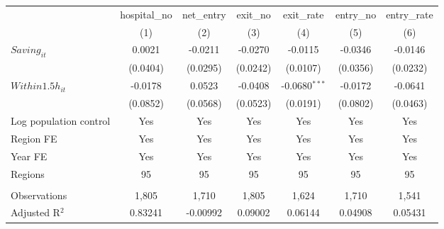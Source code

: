 \begingroup
\centering
\begin{tabular}{lcccccc}
   \toprule
                          & hospital\_no  & net\_entry  & exit\_no  & exit\_rate      & entry\_no  & entry\_rate \\    
                          & (1)           & (2)         & (3)       & (4)             & (5)        & (6)\\  
   \midrule 
   $Saving_{it}$          & 0.0021        & -0.0211     & -0.0270   & -0.0115         & -0.0346    & -0.0146\\   
                          & (0.0404)      & (0.0295)    & (0.0242)  & (0.0107)        & (0.0356)   & (0.0232)\\   
   $Within1.5h_{it}$      & -0.0178       & 0.0523      & -0.0408   & -0.0680$^{***}$ & -0.0172    & -0.0641\\   
                          & (0.0852)      & (0.0568)    & (0.0523)  & (0.0191)        & (0.0802)   & (0.0463)\\   
   Log population control & Yes           & Yes         & Yes       & Yes             & Yes        & Yes\\  
   Region FE              & Yes           & Yes         & Yes       & Yes             & Yes        & Yes\\  
   Year FE                & Yes           & Yes         & Yes       & Yes             & Yes        & Yes\\  
   Regions                & 95            & 95          & 95        & 95              & 95         & 95\\  
    \\
   Observations           & 1,805         & 1,710       & 1,805     & 1,624           & 1,710      & 1,541\\  
   Adjusted R$^2$         & 0.83241       & -0.00992    & 0.09002   & 0.06144         & 0.04908    & 0.05431\\  
   \bottomrule
\end{tabular}
\par\endgroup
